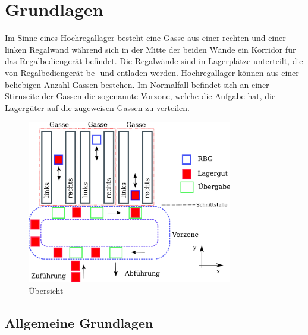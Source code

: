 \section{Grundlagen}
Im Sinne eines Hochregallager besteht eine Gasse aus einer rechten und einer linken Regalwand während sich in der Mitte der beiden Wände ein Korridor für das Regalbediengerät befindet. Die Regalwände sind in Lagerplätze unterteilt, die von Regalbediengerät be- und entladen werden. Hochregallager können aus einer beliebigen Anzahl Gassen bestehen. Im Normalfall befindet sich an einer Stirnseite der Gassen die sogenannte Vorzone, welche die Aufgabe hat, die Lagergüter auf die zugeweisen Gassen zu verteilen. 
%
\begin{figure}[h]
  \begin{center}
    \includegraphics[width=0.8\textwidth]{images/uebersicht.png}
    \caption{Übersicht}
    \label{fig:overview}
  \end{center}
\end{figure}
%

%
\subsection{Allgemeine Grundlagen}



%

